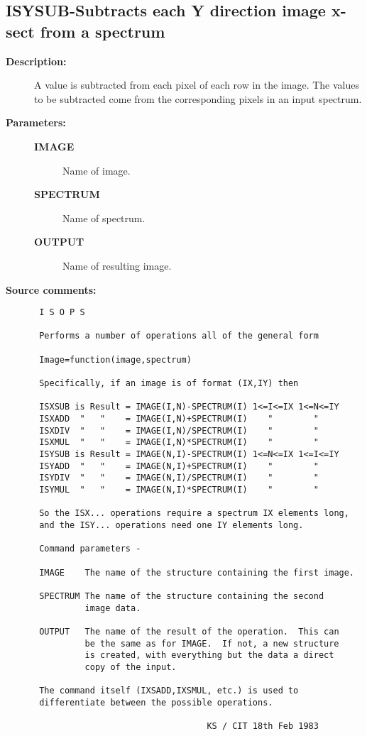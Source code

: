 \subsection{ISYSUB-\label{ISYSUB}Subtracts each Y direction image x-sect from a spectrum}
\begin{description}

\item [{\bf Description:}]
 A value is subtracted from each pixel of each row in the image.
 The values to be subtracted come from the corresponding pixels
 in an input spectrum.

\item [{\bf Parameters:}]
\begin{description}
\item [{\bf IMAGE}]
 Name of image.
\item [{\bf SPECTRUM}]
 Name of spectrum.
\item [{\bf OUTPUT}]
 Name of resulting image.
\end{description}

\item [{\bf Source comments:}]
\begin{verbatim}
 I S O P S

 Performs a number of operations all of the general form

 Image=function(image,spectrum)

 Specifically, if an image is of format (IX,IY) then

 ISXSUB is Result = IMAGE(I,N)-SPECTRUM(I) 1<=I<=IX 1<=N<=IY
 ISXADD  "   "    = IMAGE(I,N)+SPECTRUM(I)    "        "
 ISXDIV  "   "    = IMAGE(I,N)/SPECTRUM(I)    "        "
 ISXMUL  "   "    = IMAGE(I,N)*SPECTRUM(I)    "        "
 ISYSUB is Result = IMAGE(N,I)-SPECTRUM(I) 1<=N<=IX 1<=I<=IY
 ISYADD  "   "    = IMAGE(N,I)+SPECTRUM(I)    "        "
 ISYDIV  "   "    = IMAGE(N,I)/SPECTRUM(I)    "        "
 ISYMUL  "   "    = IMAGE(N,I)*SPECTRUM(I)    "        "

 So the ISX... operations require a spectrum IX elements long,
 and the ISY... operations need one IY elements long.

 Command parameters -

 IMAGE    The name of the structure containing the first image.

 SPECTRUM The name of the structure containing the second
          image data.

 OUTPUT   The name of the result of the operation.  This can
          be the same as for IMAGE.  If not, a new structure
          is created, with everything but the data a direct
          copy of the input.

 The command itself (IXSADD,IXSMUL, etc.) is used to
 differentiate between the possible operations.

                                  KS / CIT 18th Feb 1983
\end{verbatim}
\end{description}
